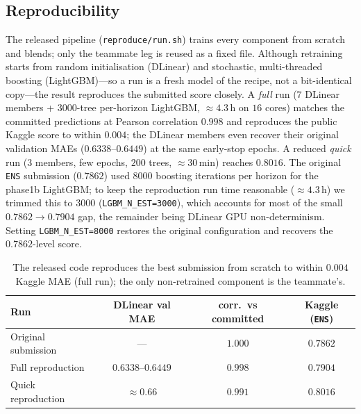 \documentclass[11pt]{article}
\begin{document}
\subsection{Reproducibility}
\label{sec:repro}
The released pipeline (\texttt{reproduce/run.sh}) trains every component from scratch and blends;
only the teammate leg is reused as a fixed file. Although retraining starts from random
initialisation (DLinear) and stochastic, multi-threaded boosting (LightGBM)---so a run is a fresh
model of the recipe, not a bit-identical copy---the result reproduces the submitted score closely.
A \emph{full} run (7 DLinear members + $3000$-tree per-horizon LightGBM, $\approx 4.3$\,h on
$16$ cores) matches the committed predictions at Pearson correlation $0.998$ and reproduces the
public Kaggle score to within $0.004$; the DLinear members even recover their original validation
MAEs ($0.6338$--$0.6449$) at the same early-stop epochs. A reduced \emph{quick} run
($3$ members, few epochs, $200$ trees, $\approx 30$\,min) reaches $0.8016$. The original
\texttt{ENS} submission ($0.7862$) used $8000$ boosting iterations per horizon for the phase1b
LightGBM; to keep the reproduction run time reasonable ($\approx 4.3$\,h) we trimmed this to
$3000$ (\texttt{LGBM\_N\_EST=3000}), which accounts for most of the small
$0.7862\!\rightarrow\!0.7904$ gap, the remainder being DLinear GPU non-determinism. Setting
\texttt{LGBM\_N\_EST=8000} restores the original configuration and recovers the $0.7862$-level score.
\begin{table}[h]
\centering
\begin{tabular}{lccc}
\toprule
Run & DLinear val MAE & corr.\ vs committed & Kaggle (\texttt{ENS}) \\
\midrule
Original submission & --- & $1.000$ & $0.7862$ \\
Full reproduction   & $0.6338$--$0.6449$ & $0.998$ & $0.7904$ \\
Quick reproduction  & $\approx 0.66$ & $0.991$ & $0.8016$ \\
\bottomrule
\end{tabular}
\caption{The released code reproduces the best submission from scratch to within $0.004$ Kaggle MAE
(full run); the only non-retrained component is the teammate's.}
\label{tab:repro}
\end{table}



\end{document}
